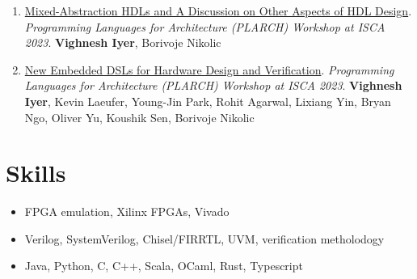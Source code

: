 \documentclass[10pt]{article}
\begin{document}
\begin{enumerate}
    \item \href{https://pldi23.sigplan.org/details/plarch-2023-papers/16/Mixed-Abstraction-HDLs-and-A-Discussion-on-Other-Aspects-of-HDL-Design}{Mixed-Abstraction HDLs and A Discussion on Other Aspects of HDL Design}. \textit{Programming Languages for Architecture (PLARCH) Workshop at ISCA 2023}. \textbf{Vighnesh Iyer}, Borivoje Nikolic
    \item \href{https://pldi23.sigplan.org/details/plarch-2023-papers/15/New-Embedded-DSLs-for-Hardware-Design-and-Verification}{New Embedded DSLs for Hardware Design and Verification}. \textit{Programming Languages for Architecture (PLARCH) Workshop at ISCA 2023}. \textbf{Vighnesh Iyer}, Kevin Laeufer, Young-Jin Park, Rohit Agarwal, Lixiang Yin, Bryan Ngo, Oliver Yu, Koushik Sen, Borivoje Nikolic
\end{enumerate}

\section{Skills}
\begin{itemize}
    \item FPGA emulation, Xilinx FPGAs, Vivado
    \item Verilog, SystemVerilog, Chisel/FIRRTL, UVM, verification metholodogy
    \item Java, Python, C, C++, Scala, OCaml, Rust, Typescript
\end{itemize}
\end{document}
